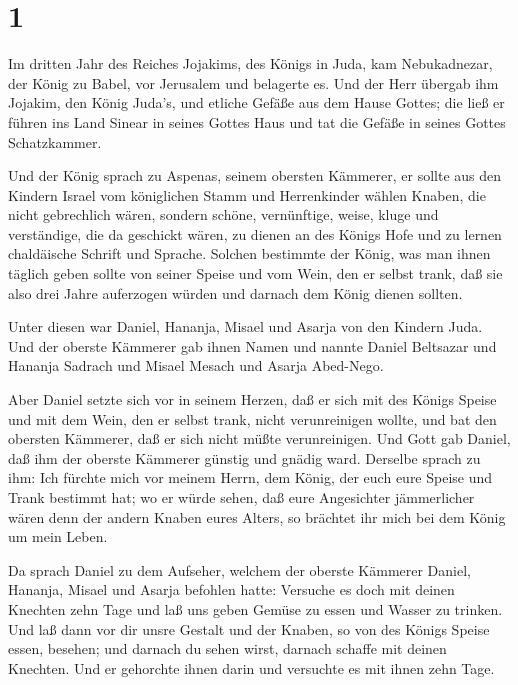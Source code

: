 \hypertarget{section}{%
\section{1}\label{section}}

 Im dritten Jahr des Reiches Jojakims, des Königs in Juda,
kam Nebukadnezar, der König zu Babel, vor Jerusalem und belagerte es.
 Und der Herr übergab ihm Jojakim, den König Juda's, und
etliche Gefäße aus dem Hause Gottes; die ließ er führen ins Land Sinear
in seines Gottes Haus und tat die Gefäße in seines Gottes Schatzkammer.

 Und der König sprach zu Aspenas, seinem obersten Kämmerer,
er sollte aus den Kindern Israel vom königlichen Stamm und Herrenkinder
wählen  Knaben, die nicht gebrechlich wären, sondern schöne,
vernünftige, weise, kluge und verständige, die da geschickt wären, zu
dienen an des Königs Hofe und zu lernen chaldäische Schrift und Sprache.
 Solchen bestimmte der König, was man ihnen täglich geben
sollte von seiner Speise und vom Wein, den er selbst trank, daß sie also
drei Jahre auferzogen würden und darnach dem König dienen sollten.

 Unter diesen war Daniel, Hananja, Misael und Asarja von den
Kindern Juda.  Und der oberste Kämmerer gab ihnen Namen und
nannte Daniel Beltsazar und Hananja Sadrach und Misael Mesach und Asarja
Abed-Nego.

 Aber Daniel setzte sich vor in seinem Herzen, daß er sich
mit des Königs Speise und mit dem Wein, den er selbst trank, nicht
verunreinigen wollte, und bat den obersten Kämmerer, daß er sich nicht
müßte verunreinigen.  Und Gott gab Daniel, daß ihm der
oberste Kämmerer günstig und gnädig ward.  Derselbe sprach
zu ihm: Ich fürchte mich vor meinem Herrn, dem König, der euch eure
Speise und Trank bestimmt hat; wo er würde sehen, daß eure Angesichter
jämmerlicher wären denn der andern Knaben eures Alters, so brächtet ihr
mich bei dem König um mein Leben.

 Da sprach Daniel zu dem Aufseher, welchem der oberste
Kämmerer Daniel, Hananja, Misael und Asarja befohlen hatte:
 Versuche es doch mit deinen Knechten zehn Tage und laß uns
geben Gemüse zu essen und Wasser zu trinken.  Und laß dann
vor dir unsre Gestalt und der Knaben, so von des Königs Speise essen,
besehen; und darnach du sehen wirst, darnach schaffe mit deinen
Knechten.  Und er gehorchte ihnen darin und versuchte es
mit ihnen zehn Tage.

